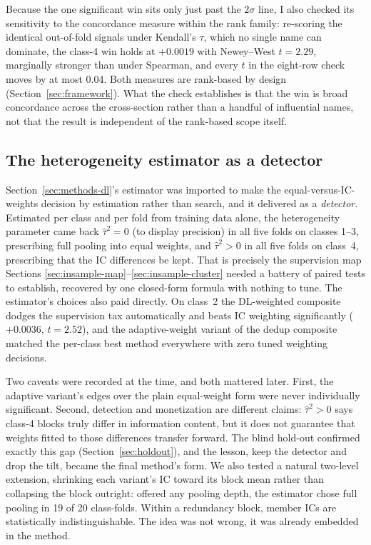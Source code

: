 \documentclass[11pt]{article}
\begin{document}
Because the one significant win sits only just past the $2\sigma$ line, I also checked its
sensitivity to the concordance measure within the rank family: re-scoring the identical
out-of-fold signals under Kendall's $\tau$, which no single name can dominate, the class-4
win holds at $+0.0019$ with Newey--West $t = 2.29$, marginally stronger than under
Spearman, and every $t$ in the eight-row check moves by at most 0.04. Both measures are
rank-based by design (Section~\ref{sec:framework}). What the check establishes is that the
win is broad concordance across the cross-section rather than a handful of influential
names, not that the result is independent of the rank-based scope itself.

\subsection{The heterogeneity estimator as a detector}
\label{sec:insample-dl}

Section~\ref{sec:methods-dl}'s estimator was imported to make the equal-versus-IC-weights
decision by estimation rather than search, and it delivered as a \emph{detector}. Estimated
per class and per fold from training data alone, the heterogeneity parameter came back
$\hat\tau^2=0$ (to display precision) in all five folds on classes 1--3, prescribing full
pooling into equal weights, and $\hat\tau^2>0$ in all five folds on class~4, prescribing
that the IC differences be kept. That is precisely the supervision map Sections
\ref{sec:insample-map}--\ref{sec:insample-cluster} needed a battery of paired tests to
establish, recovered by one closed-form formula with nothing to tune. The estimator's
choices also paid directly. On class~2 the DL-weighted composite dodges the supervision
tax automatically and beats IC weighting significantly ($+0.0036$, $t=2.52$), and the
adaptive-weight variant of the dedup composite matched the per-class best method
everywhere with zero tuned weighting decisions.

Two caveats were recorded at the time, and both mattered later. First, the adaptive
variant's edges over the plain equal-weight form were never individually significant.
Second, detection and monetization are different claims: $\hat\tau^2>0$ says class-4
blocks truly differ in information content, but it does not guarantee that weights fitted
to those differences transfer forward. The blind hold-out confirmed exactly this gap
(Section~\ref{sec:holdout}), and the lesson, keep the detector and drop the tilt, became
the final method's form. We also tested a natural two-level extension, shrinking each
variant's IC toward its block mean rather than collapsing the block outright: offered any
pooling depth, the estimator chose full pooling in 19 of 20 class-folds. Within a
redundancy block, member ICs are statistically indistinguishable. The idea was not wrong,
it was already embedded in the method.
\end{document}
